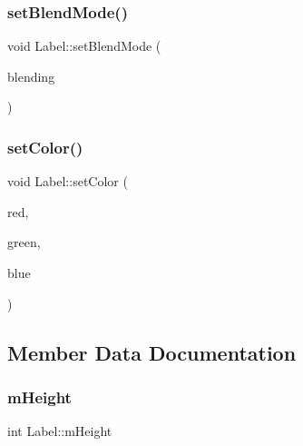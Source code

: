 \mbox{\label{class_label_a8cd51c7b2583a403790115a91f44a039}} 
\subsubsection{\texorpdfstring{set\+Blend\+Mode()}{setBlendMode()}}
{\footnotesize\ttfamily void Label\+::set\+Blend\+Mode (\begin{DoxyParamCaption}\item[{S\+D\+L\+\_\+\+Blend\+Mode}]{blending }\end{DoxyParamCaption})}

\mbox{\label{class_label_a647f75ec885d3c01a004a90ab169ade2}} 
\subsubsection{\texorpdfstring{set\+Color()}{setColor()}}
{\footnotesize\ttfamily void Label\+::set\+Color (\begin{DoxyParamCaption}\item[{Uint8}]{red,  }\item[{Uint8}]{green,  }\item[{Uint8}]{blue }\end{DoxyParamCaption})}



\subsection{Member Data Documentation}
\mbox{\label{class_label_a5436ac2014bcb2f0ab05729f6c642b45}} 
\subsubsection{\texorpdfstring{m\+Height}{mHeight}}
{\footnotesize\ttfamily int Label\+::m\+Height\hspace{0.3cm}{\ttfamily [private]}}

\mbox{\label{class_label_aa95ec4d816146a95690b2d4c1bddc7d5}} 
